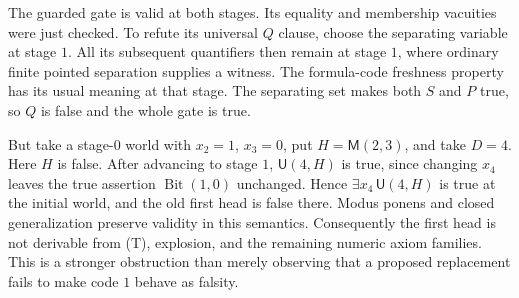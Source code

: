 The guarded gate is valid at both stages.  Its equality and membership
vacuities were just checked.  To refute its universal $Q$ clause, choose
the separating variable at stage $1$.  All its subsequent quantifiers
then remain at stage $1$, where ordinary finite pointed separation
supplies a witness.  The formula-code freshness property has its usual
meaning at that stage.  The separating set makes both $S$ and $P$ true,
so $Q$ is false and the whole gate is true.

But take a stage-$0$ world with $x_2=1$, $x_3=0$, put
$H=\mathsf M(2,3)$, and take $D=4$.  Here $H$ is false.  After advancing
to stage $1$, $\mathsf U(4,H)$ is true, since changing $x_4$ leaves the
true assertion $\operatorname{Bit}(1,0)$ unchanged.  Hence
$\exists x_4\,\mathsf U(4,H)$ is true at the initial world, and the old
first head is false there.  Modus ponens and closed generalization
preserve validity in this semantics.  Consequently the first head is
not derivable from \textup{(T)}, explosion, and the remaining numeric
axiom families.  This is a stronger obstruction than merely observing
that a proposed replacement fails to make code $1$ behave as falsity.
